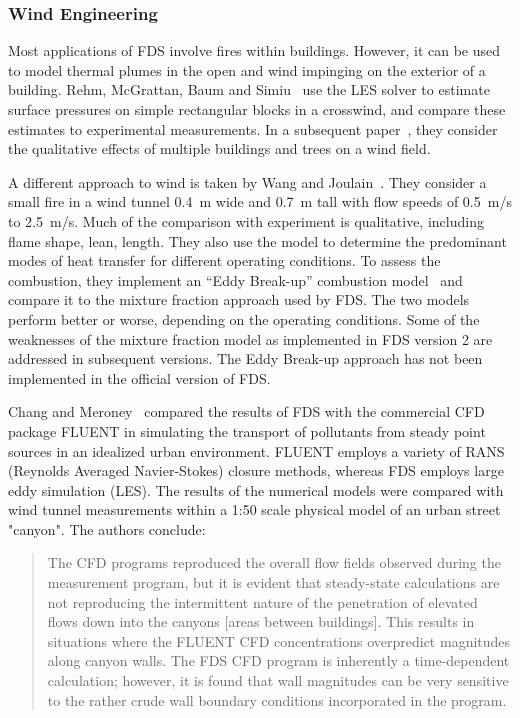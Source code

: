 \subsubsection{Wind Engineering}

Most applications  of FDS involve fires within  buildings. However, it can be used to model thermal  plumes in the open and wind impinging on the
exterior   of   a   building.    Rehm,   McGrattan,   Baum   and Simiu~\cite{LES:4} use the LES solver to estimate surface pressures on simple
rectangular blocks in  a crosswind, and compare these estimates to experimental measurements.  In a subsequent paper~\cite{Rehm:WS02}, they consider
the qualitative  effects of multiple buildings and trees on a wind field.

A   different    approach   to   wind    is   taken   by    Wang   and Joulain~\cite{Wang:IAFSS2002}. They  consider a  small fire in  a wind tunnel
0.4~m wide  and  0.7~m tall  with  flow speeds  of 0.5~m/s  to 2.5~m/s.  Much  of  the  comparison with  experiment  is  qualitative, including
flame shape,  lean,  length.  They also  use  the model  to determine  the  predominant  modes  of  heat  transfer  for  different operating
conditions. To  assess  the combustion,  they implement  an ``Eddy Break-up''  combustion model~\cite{Magnussen:1} and  compare it to the mixture
fraction approach used by FDS.  The two models perform better or  worse, depending on  the operating conditions. Some  of the weaknesses of the
mixture fraction model as implemented in FDS version 2 are addressed in subsequent versions. The Eddy Break-up approach has not been implemented in
the official version of FDS.

Chang and Meroney~\cite{ChangJWE2003} compared the results of FDS with the  commercial CFD  package  FLUENT in  simulating  the transport  of
pollutants   from  steady   point  sources   in  an   idealized  urban environment.  FLUENT  employs a  variety  of  RANS (Reynolds  Averaged
Navier-Stokes)  closure  methods,   whereas  FDS  employs  large  eddy simulation (LES).   The results of the numerical  models were compared with
wind tunnel measurements within a 1:50 scale physical model of an urban street "canyon". The authors conclude:
\begin{quote}
The CFD  programs reproduced the  overall flow fields  observed during the  measurement   program,  but  it  is   evident  that  steady-state
calculations  are  not  reproducing  the intermittent  nature  of  the penetration  of elevated flows  down into  the canyons  [areas between
buildings].  This   results  in   situations  where  the   FLUENT  CFD concentrations overpredict magnitudes along  canyon walls. The FDS CFD program
is inherently  a time-dependent  calculation; however,  it is found that wall  magnitudes can be very sensitive  to the rather crude wall boundary
conditions incorporated in the program.
\end{quote}


